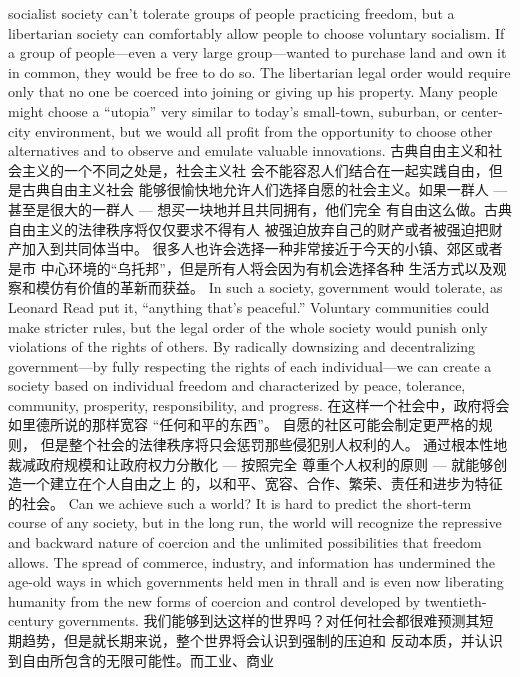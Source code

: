 \begin{paracol}{2}
socialist society can't tolerate groups of people practicing freedom, but a libertarian society can comfortably allow people to
choose voluntary socialism. If a group of people---even a very
large group---wanted to purchase land and own it in common,
they would be free to do so. The libertarian legal order would
require only that no one be coerced into joining or giving up his
property. Many people might choose a ``utopia'' very similar to
today's small-town, suburban, or center-city environment, but
we would all profit from the opportunity to choose other alternatives and to observe and emulate valuable innovations.
\switchcolumn
古典自由主义和社会主义的一个不同之处是，社会主义社
会不能容忍人们结合在一起实践自由，但是古典自由主义社会
能够很愉快地允许人们选择自愿的社会主义。如果一群人 ---
甚至是很大的一群人 --- 想买一块地并且共同拥有，他们完全
有自由这么做。古典自由主义的法律秩序将仅仅要求不得有人
被强迫放弃自己的财产或者被强迫把财产加入到共同体当中。
很多人也许会选择一种非常接近于今天的小镇、郊区或者是市
中心环境的“乌托邦”，但是所有人将会因为有机会选择各种
生活方式以及观察和模仿有价值的革新而获益。
\switchcolumn*
In such a society, government would tolerate, as Leonard
Read put it, ``anything that's peaceful.'' Voluntary communities
could make stricter rules, but the legal order of the whole society would punish only violations of the rights of others. By radically downsizing and decentralizing government---by fully
respecting the rights of each individual---we can create a society based on individual freedom and characterized by peace,
tolerance, community, prosperity, responsibility, and progress.
\switchcolumn
在这样一个社会中，政府将会如里德所说的那样宽容
“任何和平的东西”。 自愿的社区可能会制定更严格的规则，
但是整个社会的法律秩序将只会惩罚那些侵犯别人权利的人。
通过根本性地裁减政府规模和让政府权力分散化 --- 按照完全
尊重个人权利的原则 --- 就能够创造一个建立在个人自由之上
的，以和平、宽容、合作、繁荣、责任和进步为特征的社会。
\switchcolumn*
Can we achieve such a world? It is hard to predict the short-term course of any society, but in the long run, the world will
recognize the repressive and backward nature of coercion and
the unlimited possibilities that freedom allows. The spread of
commerce, industry, and information has undermined the age-old ways in which governments held men in thrall and is even
now liberating humanity from the new forms of coercion and
control developed by twentieth-century governments.
\switchcolumn
我们能够到达这样的世界吗？对任何社会都很难预测其短
期趋势，但是就长期来说，整个世界将会认识到强制的压迫和
反动本质，并认识到自由所包含的无限可能性。而工业、商业

\end{paracol}

